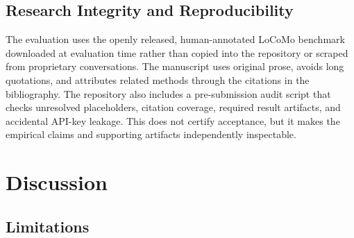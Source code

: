 \documentclass[conference]{IEEEtran}
\begin{document}
\subsection{Research Integrity and Reproducibility}

The evaluation uses the openly released, human-annotated LoCoMo benchmark downloaded at evaluation time rather than copied into the repository or scraped from proprietary conversations. The manuscript uses original prose, avoids long quotations, and attributes related methods through the citations in the bibliography. The repository also includes a pre-submission audit script that checks unresolved placeholders, citation coverage, required result artifacts, and accidental API-key leakage. This does not certify acceptance, but it makes the empirical claims and supporting artifacts independently inspectable.

\section{Discussion}

\subsection{Limitations}
\end{document}
